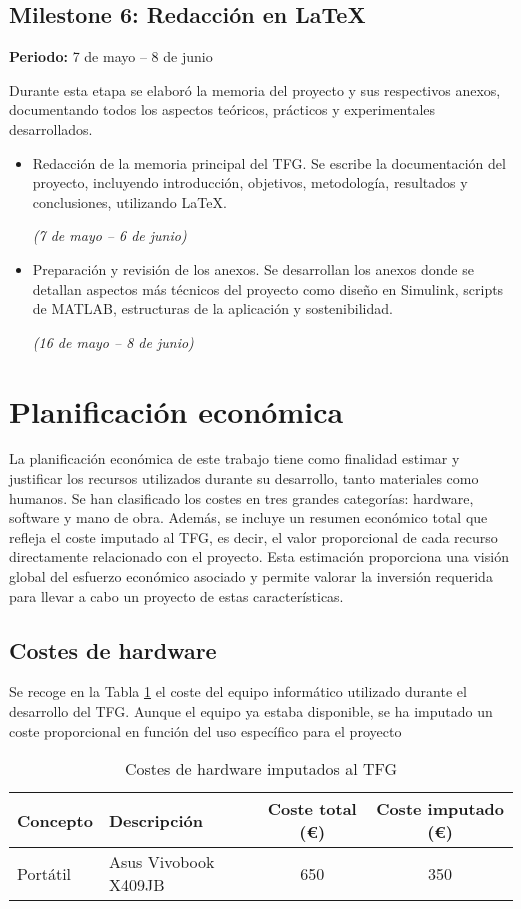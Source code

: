 \subsection*{Milestone 6: Redacción en LaTeX}
\textbf{Periodo:} 7 de mayo – 8 de junio

Durante esta etapa se elaboró la memoria del proyecto y sus respectivos anexos, documentando todos los aspectos teóricos, prácticos y experimentales desarrollados.

\begin{itemize}
    \item Redacción de la memoria principal del TFG. Se escribe la documentación del proyecto, incluyendo introducción, objetivos, metodología, resultados y conclusiones, utilizando LaTeX.
    
    \textit{(7 de mayo – 6 de junio)}
    \item Preparación y revisión de los anexos. Se desarrollan los anexos donde se detallan aspectos más técnicos del proyecto como diseño en Simulink, scripts de MATLAB, estructuras de la aplicación y sostenibilidad. 
    
    \textit{(16 de mayo – 8 de junio)}
\end{itemize}




\section{Planificación económica}
La planificación económica de este trabajo tiene como finalidad estimar y justificar los recursos utilizados durante su desarrollo, tanto materiales como humanos. Se han clasificado los costes en tres grandes categorías: hardware, software y mano de obra. Además, se incluye un resumen económico total que refleja el coste imputado al TFG, es decir, el valor proporcional de cada recurso directamente relacionado con el proyecto. Esta estimación proporciona una visión global del esfuerzo económico asociado y permite valorar la inversión requerida para llevar a cabo un proyecto de estas características.

\subsection{Costes de hardware}

Se recoge en la Tabla \ref{hardware} el coste del equipo informático utilizado durante el desarrollo del TFG. Aunque el equipo ya estaba disponible, se ha imputado un coste proporcional en función del uso específico para el proyecto
\begin{table}[H]

\centering
\small
\begin{tabular}{|l|l|c|c|}
\hline
\textbf{Concepto} & \textbf{Descripción} & \textbf{Coste total (€)} & \textbf{Coste imputado (€)} \\
\hline
Portátil & Asus Vivobook X409JB & 650 & 350 \\
\hline
\end{tabular}
\caption{Costes de hardware imputados al TFG}
\label{hardware}
\end{table}

